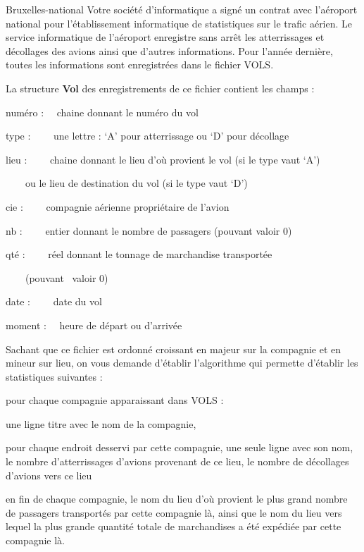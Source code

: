 \begin{Exercice}{Bruxelles-national}
	Votre société d’informatique a signé un contrat avec l’aéroport national
	pour l’établissement informatique de statistiques sur le trafic aérien.
	Le service informatique de l’aéroport enregistre sans arrêt les
	atterrissages et décollages des avions ainsi que d’autres informations.
	Pour l’année dernière, toutes les informations sont enregistrées dans
	le fichier VOLS.

	La structure \textbf{Vol} des enregistrements de ce fichier contient les
	champs : 

	{	numéro : \ \ chaine donnant le numéro du vol}

	{	type  : \ \ \ \ une lettre : ‘A’ pour atterrissage ou ‘D’ pour
	décollage}

	{	lieu : \ \ \ \ chaine donnant le lieu d’où provient le vol (si le type
	vaut ‘A’) }

	{	\ \ \ \ ou le lieu de destination du vol (si le type vaut ‘D’)}

	{	cie : \ \ \ \ compagnie aérienne propriétaire de l’avion}

	{	nb : \ \ \ \ entier donnant le nombre de passagers (pouvant valoir 0)}

	{	qté : \ \ \ \ réel donnant le tonnage de marchandise transportée }

	{	\ \ \ \ (pouvant \ valoir 0)}

	{	date : \ \ \ \ date du vol}

	{	moment : \ \ heure de départ ou d’arrivée}

	Sachant que ce fichier est ordonné croissant en majeur sur la compagnie
	et en mineur sur lieu, on vous demande d’établir l’algorithme qui
	permette d’établir les statistiques suivantes :

	\begin{liste}
		\item 
			pour chaque compagnie apparaissant dans VOLS :
		\item 
			une ligne titre avec le nom de la compagnie,
		\item 
			pour chaque endroit desservi par cette compagnie, une seule ligne avec
			son nom, le nombre d’atterrissages d’avions provenant de ce lieu, le
			nombre de décollages d’avions vers ce lieu
		\item 
			en fin de chaque compagnie, le nom du lieu d’où provient le plus grand
			nombre de passagers transportés par cette compagnie là, ainsi que le
			nom du lieu vers lequel la plus grande quantité totale de marchandises
			a été expédiée par cette compagnie là.
	\end{liste}


\end{Exercice}
